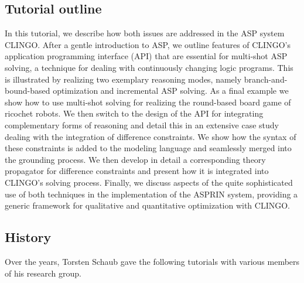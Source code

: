 \documentclass{article}
\begin{document}
\subsection*{Tutorial outline}

In this tutorial, we describe how both issues are addressed in the ASP system CLINGO.
After a gentle introduction to ASP, we outline features of CLINGO's application programming interface (API) that are essential for multi-shot ASP solving,
a technique for dealing with continuously changing logic programs.
This is illustrated by realizing two exemplary reasoning modes, namely branch-and-bound-based optimization and incremental ASP solving.
As a final example we show how to use multi-shot solving for realizing the round-based board game of ricochet robots.
We then switch to the design of the API for integrating complementary forms of reasoning and detail this in an extensive case study
dealing with the integration of difference constraints.
We show how the syntax of these constraints is added to the modeling language and seamlessly merged into the grounding process.
We then develop in detail a corresponding theory propagator for difference constraints and present how it is integrated into CLINGO's solving process.
Finally, we discuss aspects of the quite sophisticated use of both techniques in the implementation of the ASPRIN system,
providing a generic framework for qualitative and quantitative optimization with CLINGO.

\subsection*{History}

Over the years, Torsten Schaub gave the following tutorials with various members of his research group.
\end{document}
